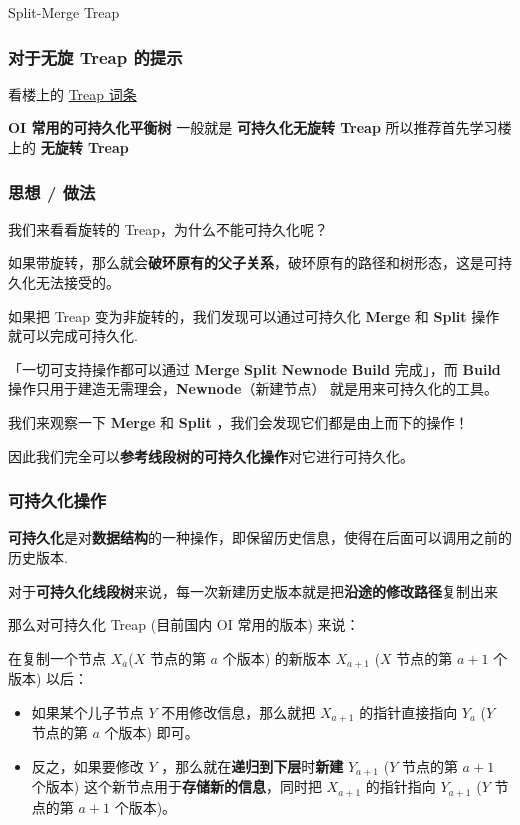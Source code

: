 
Split-Merge Treap

\hr

\subsubsection{对于无旋 Treap 的提示}

看楼上的 \href{/ds/treap/}{Treap 词条}

\textbf{OI 常用的可持久化平衡树} 一般就是 \textbf{可持久化无旋转 Treap} 所以推荐首先学习楼上的 \textbf{无旋转 Treap}

\subsubsection{思想 / 做法}

我们来看看旋转的 Treap，为什么不能可持久化呢？

如果带旋转，那么就会\textbf{破环原有的父子关系}，破环原有的路径和树形态，这是可持久化无法接受的。

如果把 Treap 变为非旋转的，我们发现可以通过可持久化 \textbf{Merge} 和 \textbf{Split} 操作就可以完成可持久化.

「一切可支持操作都可以通过 \textbf{Merge} \textbf{Split} \textbf{Newnode} \textbf{Build} 完成」，而 \textbf{Build} 操作只用于建造无需理会，\textbf{Newnode}（新建节点） 就是用来可持久化的工具。

我们来观察一下 \textbf{Merge} 和 \textbf{Split} ，我们会发现它们都是由上而下的操作！

因此我们完全可以\textbf{参考线段树的可持久化操作}对它进行可持久化。

\subsubsection{可持久化操作}

\textbf{可持久化}是对\textbf{数据结构}的一种操作，即保留历史信息，使得在后面可以调用之前的历史版本.

对于\textbf{可持久化线段树}来说，每一次新建历史版本就是把\textbf{沿途的修改路径}复制出来

那么对可持久化 Treap (目前国内 OI 常用的版本) 来说：

在复制一个节点 $X_{a}$($X$ 节点的第 $a$ 个版本) 的新版本 $X_{a+1}$ ($X$ 节点的第 $a+1$ 个版本) 以后：

\begin{itemize}
\item 如果某个儿子节点 $Y$ 不用修改信息，那么就把 $X_{a+1}$ 的指针直接指向 $Y_{a}$ ($Y$ 节点的第 $a$ 个版本) 即可。
\item 反之，如果要修改 $Y$ ，那么就在\textbf{递归到下层}时\textbf{新建} $Y_{a+1}$ ($Y$ 节点的第 $a+1$ 个版本) 这个新节点用于\textbf{存储新的信息}，同时把 $X_{a+1}$ 的指针指向 $Y_{a+1}$ ($Y$ 节点的第 $a+1$ 个版本)。
\end{itemize}

